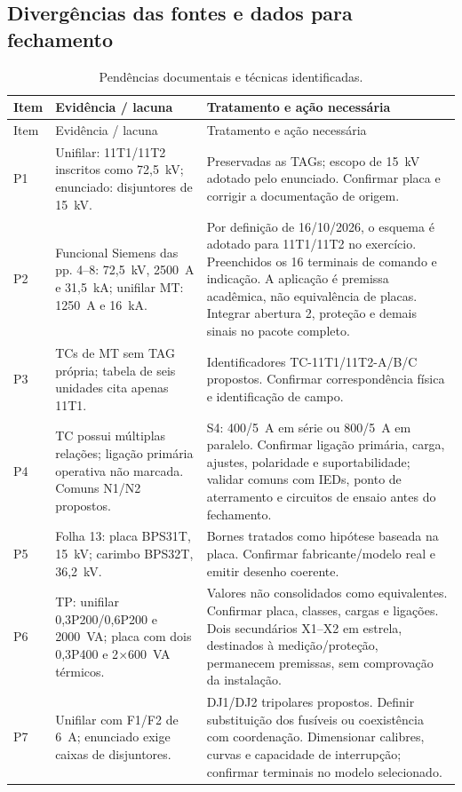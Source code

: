 \documentclass[11pt,a4paper]{article}
\renewcommand{\arraystretch}{1.2}
\begin{document}
\subsection{Divergências das fontes e dados para fechamento}
\begingroup\footnotesize
\setlength{\parskip}{0pt}\setlength{\LTpre}{6pt}\setlength{\LTpost}{6pt}
\renewcommand{\arraystretch}{1.15}
\begin{longtable}{@{}L{1.0cm}L{6.2cm}L{8.1cm}@{}}
\caption{Pendências documentais e técnicas identificadas.}\\
\toprule Item & Evidência / lacuna & Tratamento e ação necessária \\\midrule\endfirsthead
\toprule Item & Evidência / lacuna & Tratamento e ação necessária \\\midrule\endhead
\bottomrule\endfoot
P1 & Unifilar: 11T1/11T2 inscritos como 72,5~kV; enunciado: disjuntores de 15~kV. & Preservadas as TAGs; escopo de 15~kV adotado pelo enunciado. Confirmar placa e corrigir a documentação de origem.\\
P2 & Funcional Siemens das pp. 4--8: 72,5~kV, 2500~A e 31,5~kA; unifilar MT: 1250~A e 16~kA. & Por definição de 16/10/2026, o esquema é adotado para 11T1/11T2 no exercício. Preenchidos os 16 terminais de comando e indicação. A aplicação é premissa acadêmica, não equivalência de placas. Integrar abertura 2, proteção e demais sinais no pacote completo.\\
P3 & TCs de MT sem TAG própria; tabela de seis unidades cita apenas 11T1. & Identificadores TC-11T1/11T2-A/B/C propostos. Confirmar correspondência física e identificação de campo.\\
P4 & TC possui múltiplas relações; ligação primária operativa não marcada. Comuns N1/N2 propostos. & S4: 400/5~A em série ou 800/5~A em paralelo. Confirmar ligação primária, carga, ajustes, polaridade e suportabilidade; validar comuns com IEDs, ponto de aterramento e circuitos de ensaio antes do fechamento.\\
P5 & Folha 13: placa BPS31T, 15~kV; carimbo BPS32T, 36,2~kV. & Bornes tratados como hipótese baseada na placa. Confirmar fabricante/modelo real e emitir desenho coerente.\\
P6 & TP: unifilar 0,3P200/0,6P200 e 2000~VA; placa com dois 0,3P400 e 2$\times$600~VA térmicos. & Valores não consolidados como equivalentes. Confirmar placa, classes, cargas e ligações. Dois secundários X1--X2 em estrela, destinados à medição/proteção, permanecem premissas, sem comprovação da instalação.\\
P7 & Unifilar com F1/F2 de 6~A; enunciado exige caixas de disjuntores. & DJ1/DJ2 tripolares propostos. Definir substituição dos fusíveis ou coexistência com coordenação. Dimensionar calibres, curvas e capacidade de interrupção; confirmar terminais no modelo selecionado.\\

\end{longtable}
\end{document}
